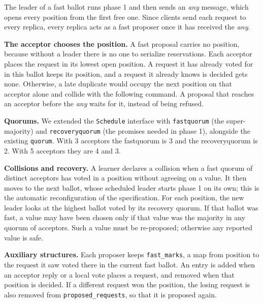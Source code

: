 \documentclass[times, 10pt,twocolumn]{article}
\begin{document}

The leader of a fast ballot runs phase 1 and then sends an \emph{any} message,
which opens every position from the first free one. Since clients send each
request to every replica, every replica acts as a fast proposer once it has
received the \emph{any}.

\textbf{The acceptor chooses the position.} A fast proposal carries no
position, because without a leader there is no one to serialize reservations.
Each acceptor places the request in its lowest open position. A request it
has already voted for in this ballot keeps its position, and a request it
already knows is decided gets none. Otherwise, a late duplicate would occupy
the next position on that acceptor alone and collide with the following
command. A proposal that reaches an acceptor before the \emph{any} waits for
it, instead of being refused.

\textbf{Quorums.} We extended the \texttt{Schedule} interface with
\texttt{fastquorum} (the super-majority) and \texttt{recoveryquorum} (the
promises needed in phase 1), alongside the existing \texttt{quorum}. With 3
acceptors the {fastquorum} is 3 and the {recoveryquorum} is 2. With 5 
acceptors they are 4 and 3.


\textbf{Collisions and recovery.} A learner declares a collision when a fast
quorum of distinct acceptors has voted in a position without agreeing on a
value. It then moves to the next ballot, whose scheduled leader starts phase 1
on its own; this is the automatic reconfiguration of the specification. For
each position, the new leader looks at the highest ballot voted by its
recovery quorum. If that ballot was fast, a value may have been chosen only if
that value was the majority in any quorum of acceptors. Such a value must be
re-proposed; otherwise any reported value is safe.


\textbf{Auxiliary structures.} Each proposer keeps \texttt{fast\_marks}, a map
from position to the request it saw voted there in the current fast ballot.
An entry is added when an acceptor reply or a local vote places a request,
and removed when that position is decided. If a different request won the
position, the losing request is also removed from
\texttt{proposed\_requests}, so that it is proposed again.

\end{document}
